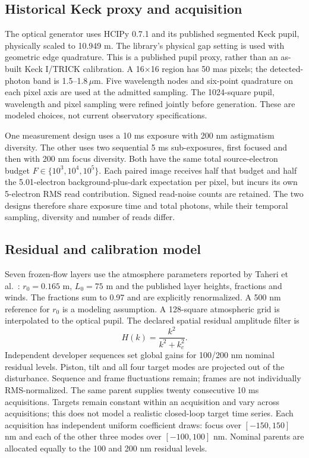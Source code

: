 \documentclass[11pt,a4paper]{article}
\begin{document}
\subsection{Historical Keck proxy and acquisition}
The optical generator uses HCIPy 0.7.1 \cite{por} and its published segmented
Keck pupil, physically scaled to 10.949 m. The library's physical gap setting is
used with geometric edge quadrature. This is a published pupil proxy, rather
than an as-built Keck I/TRICK calibration. A 16$\times$16 region has 50 mas pixels;
the detected-photon band is 1.5--1.8$\,\mu$m. Five wavelength nodes and
six-point quadrature on each pixel axis are used at the admitted sampling.
The 1024-square pupil, wavelength and pixel sampling were refined jointly
before generation. These are modeled choices, not current observatory specifications.

One measurement design uses a 10 ms exposure with 200 nm astigmatism diversity.
The other uses two sequential 5 ms sub-exposures, first focused and then with
200 nm focus diversity. Both have the same total source-electron budget
$F\in\{10^3,10^4,10^5\}$. Each paired image receives half that budget and half
the 5.01-electron background-plus-dark expectation per pixel, but incurs its
own 5-electron RMS read contribution. Signed read-noise counts are retained.
The two designs therefore share exposure time and total photons, while their
temporal sampling, diversity and number of reads differ.

\subsection{Residual and calibration model}
Seven frozen-flow layers use the atmosphere parameters reported by
Taheri et al.\ \cite{taheri}: $r_0=0.165$ m, $L_0=75$ m and the published layer
heights, fractions and winds. The fractions sum to 0.97 and are explicitly
renormalized. A 500 nm reference for $r_0$ is a modeling assumption. A 128-square
atmospheric grid is interpolated to the optical pupil. The declared spatial
residual amplitude filter is
\begin{equation}
 H(k)=\frac{k^2}{k^2+k_c^2}.
\end{equation}
Independent developer sequences set global gains for 100/200 nm nominal residual
levels. Piston, tilt and all four target modes are projected out of the
disturbance. Sequence and frame fluctuations remain; frames are not individually
RMS-normalized. The same parent supplies twenty consecutive 10 ms acquisitions.
Targets remain constant within an acquisition and vary across acquisitions;
this does not model a realistic closed-loop target time series.
Each acquisition has independent uniform coefficient draws: focus over
$[-150,150]$ nm and each of the other three modes over $[-100,100]$ nm.
Nominal parents are allocated equally to the 100 and 200 nm residual levels.
\end{document}
